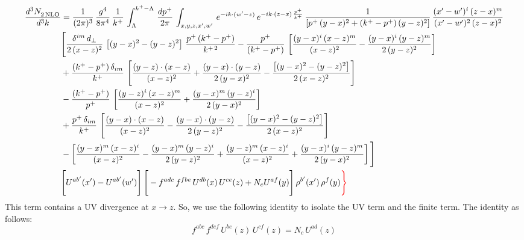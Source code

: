 \documentclass[9pt]{article}
\numberwithin{equation}{section}
\begin{document}
\begin{align}
    \frac{d^{3}N_{2\,\rm NLO}^{\rm}}{d^{3}k}  & =  \frac{1}{(2\pi)^{3}}\, \frac{g^{4}}{8\pi^{4}}\,\frac{1}{k^{+}}\,\int_{\Lambda}^{k^{+}-\Lambda}\, \frac{dp^{+}}{2\pi} \, \int_{x,y,z,x',w'}\,e^{-ik\cdot(w'-z)}\,e^{-ik\cdot (z-x)\,\frac{p^{+}}{k^{+}}}\,\frac{1}{\left[p^{+}\,(y-x)^{2}+(k^{+}-p^{+})\,(y-z)^{2}\right]}\, \frac{(x'-w')^{i}\,(z-x)^{m}}{(x'-w')^{2}\,(z-x)^{2}} \notag \\ & \Bigg[\frac{\delta^{im}\,d_{\perp}}{2\,(x-z)^{2}}\,\left[(y-x)^{2}-(y-z)^{2}\right]\,\frac{p^{+}\,(k^{+}-p^{+})}{k^{+\,2}}-\frac{p^{+}}{(k^{+}-p^{+})}\,\left[\frac{(y-x)^{i}\,(x-z)^{m}}{(x-z)^{2}}-\frac{(y-x)^{i}\,(y-z)^{m}}{2\,(y-z)^{2}}\right]\notag \\ & +\frac{(k^{+}-p^{+})\,\delta_{im}}{k^{+}}\,\left[\frac{(y-z)\cdot (x-z)}{(x-z)^{2}}+\frac{(y-x)\cdot (y-z)}{2\,(y-x)^{2}}-\frac{\left[(y-x)^{2}-(y-z)^{2}\right]}{2\,(x-z)^{2}}\right]\notag \\ & -\frac{(k^{+}-p^{+})}{p^{+}}\,\left[\frac{(y-z)^{i}\,(x-z)^{m}}{(x-z)^{2}}+\frac{(y-x)^{m}\,(y-z)^{i}}{2\,(y-x)^{2}}\right]\notag \\ & +\frac{p^{+}\,\delta_{im}}{k^{+}}\,\left[\frac{(y-x)\cdot (x-z)}{(x-z)^{2}}-\frac{(y-x)\cdot (y-z)}{2\,(y-z)^{2}}-\frac{\left[(y-x)^{2}-(y-z)^{2}\right]}{2\,(x-z)^{2}}\right]\notag \\ &-\left[\frac{(y-x)^{m}\,(x-z)^{i}}{(x-z)^{2}}-\frac{(y-x)^{m}\,(y-z)^{i}}{2\,(y-z)^{2}}+\frac{(y-z)^{m}\,(x-z)^{i}}{(x-z)^{2}}+\frac{(y-x)^{i}\,(y-z)^{m}}{2\,(y-x)^{2}}\right]\Bigg] \notag \\ & \Bigg[U^{ab'}(x')-U^{ab'}(w')\Bigg]\,\Bigg[-f^{adc}\,f^{fbe}\,U^{db}(x)\,U^{ce}(z)+N_{c}U^{af}(y)\Bigg]\,\rho^{b'}(x')\,\rho^{f}(y){\color{red}\Bigg\}}
\end{align}
This term contains a UV divergence at $x\rightarrow z$.  So, we use the following identity to isolate the UV term and the finite term. The identity as follows:
$$f^{abc}\,f^{def}\,U^{be}(z)\,U^{cf}(z) = N_{c}\,U^{ad}(z)$$
\end{document}
